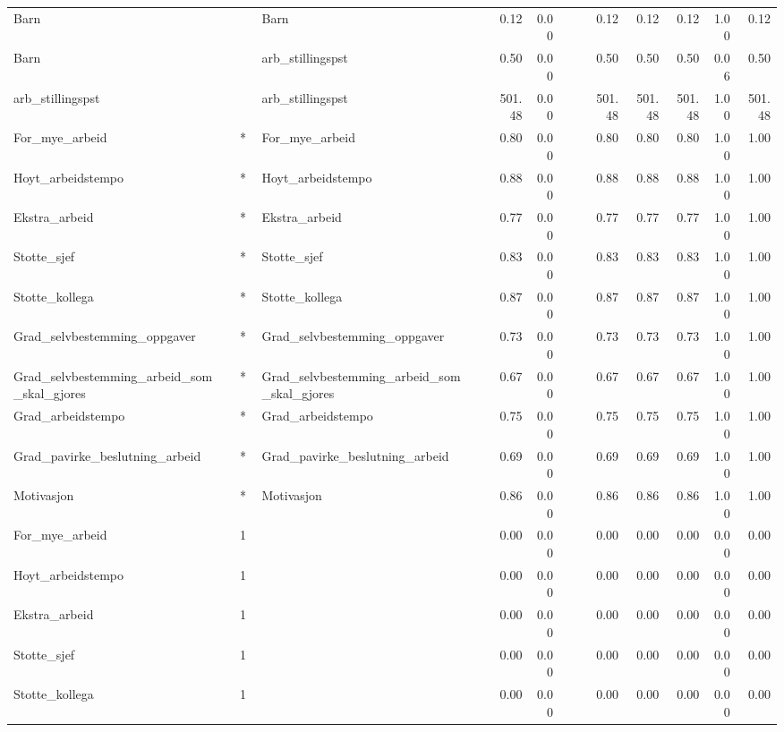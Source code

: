\documentclass[
  12pt,
  a4paper,
  DIV=11,
  numbers=noendperiod]{scrartcl}
\begin{document}
\begin{table}[ht]
\begin{tabular}{llllrrrrrrrrr}
  Barn & ~~ & Barn &  & 0.12 & 0.00 &  &  & 0.12 & 0.12 & 0.12 & 1.00 & 0.12 \\ 
  Barn & ~~ & arb\_stillingspst &  & 0.50 & 0.00 &  &  & 0.50 & 0.50 & 0.50 & 0.06 & 0.50 \\ 
  arb\_stillingspst & ~~ & arb\_stillingspst &  & 501.48 & 0.00 &  &  & 501.48 & 501.48 & 501.48 & 1.00 & 501.48 \\ 
  For\_mye\_arbeid & ~*~ & For\_mye\_arbeid &  & 0.80 & 0.00 &  &  & 0.80 & 0.80 & 0.80 & 1.00 & 1.00 \\ 
  Hoyt\_arbeidstempo & ~*~ & Hoyt\_arbeidstempo &  & 0.88 & 0.00 &  &  & 0.88 & 0.88 & 0.88 & 1.00 & 1.00 \\ 
  Ekstra\_arbeid & ~*~ & Ekstra\_arbeid &  & 0.77 & 0.00 &  &  & 0.77 & 0.77 & 0.77 & 1.00 & 1.00 \\ 
  Stotte\_sjef & ~*~ & Stotte\_sjef &  & 0.83 & 0.00 &  &  & 0.83 & 0.83 & 0.83 & 1.00 & 1.00 \\ 
  Stotte\_kollega & ~*~ & Stotte\_kollega &  & 0.87 & 0.00 &  &  & 0.87 & 0.87 & 0.87 & 1.00 & 1.00 \\ 
  Grad\_selvbestemming\_oppgaver & ~*~ & Grad\_selvbestemming\_oppgaver &  & 0.73 & 0.00 &  &  & 0.73 & 0.73 & 0.73 & 1.00 & 1.00 \\ 
  Grad\_selvbestemming\_arbeid\_som\_skal\_gjores & ~*~ & Grad\_selvbestemming\_arbeid\_som\_skal\_gjores &  & 0.67 & 0.00 &  &  & 0.67 & 0.67 & 0.67 & 1.00 & 1.00 \\ 
  Grad\_arbeidstempo & ~*~ & Grad\_arbeidstempo &  & 0.75 & 0.00 &  &  & 0.75 & 0.75 & 0.75 & 1.00 & 1.00 \\ 
  Grad\_pavirke\_beslutning\_arbeid & ~*~ & Grad\_pavirke\_beslutning\_arbeid &  & 0.69 & 0.00 &  &  & 0.69 & 0.69 & 0.69 & 1.00 & 1.00 \\ 
  Motivasjon & ~*~ & Motivasjon &  & 0.86 & 0.00 &  &  & 0.86 & 0.86 & 0.86 & 1.00 & 1.00 \\ 
  For\_mye\_arbeid & ~1 &  &  & 0.00 & 0.00 &  &  & 0.00 & 0.00 & 0.00 & 0.00 & 0.00 \\ 
  Hoyt\_arbeidstempo & ~1 &  &  & 0.00 & 0.00 &  &  & 0.00 & 0.00 & 0.00 & 0.00 & 0.00 \\ 
  Ekstra\_arbeid & ~1 &  &  & 0.00 & 0.00 &  &  & 0.00 & 0.00 & 0.00 & 0.00 & 0.00 \\ 
  Stotte\_sjef & ~1 &  &  & 0.00 & 0.00 &  &  & 0.00 & 0.00 & 0.00 & 0.00 & 0.00 \\ 
  Stotte\_kollega & ~1 &  &  & 0.00 & 0.00 &  &  & 0.00 & 0.00 & 0.00 & 0.00 & 0.00 \\ 

\end{tabular}
\end{table}
\end{document}
